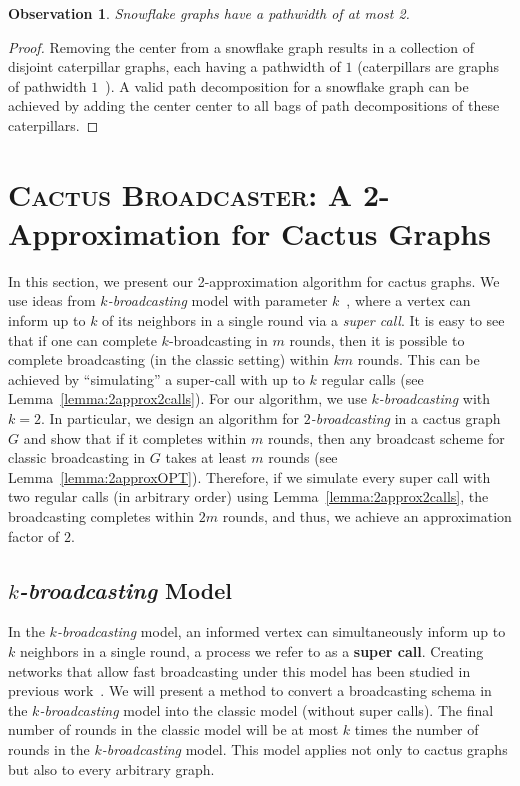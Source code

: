 \documentclass[letterpaper,11pt]{article}
\newtheorem{observation}{Observation}[section]
\newcommand{\flower}{snowflake\xspace}
\newcommand{\Flower}{Snowflake\xspace}
\newcommand{\pistil}{center\xspace}
\newcommand{\fast}{\textit{$k$-broadcasting}\xspace}
\newcommand{\Fast}{\textit{$k$-broadcasting}\xspace}
\newcommand{\twofast}{\textit{$2$-broadcasting}\xspace}
\newcommand{\ouralgo}{\textsc{Cactus Broadcaster}\xspace}
\begin{document}
\begin{observation}
\label{obs:flower-pathwidth}
    \Flower graphs have a pathwidth of at most 2. 
\end{observation}

\begin{proof}
    Removing the \pistil from a \flower graph results in a collection of disjoint caterpillar graphs, each having a pathwidth of $1$ (caterpillars are graphs of pathwidth $1$~\cite{ProskurowskiT99}). 
    A valid path decomposition for a \flower graph can be achieved by adding the \pistil center to all bags of path decompositions of these caterpillars. 
\end{proof}

 \section{\ouralgo: A 2-Approximation for Cactus Graphs}
\label{sec:2approx}

In this section, we present our 2-approximation algorithm for cactus graphs. We use ideas from \fast model with parameter $k$~\cite{grigni1991tightkbroad}, where a vertex can inform up to $k$ of its neighbors in a single round via a 
\emph{super call}. It is easy to see that if one can complete $k$-broadcasting in $m$ rounds, then it is possible to complete broadcasting (in the classic setting) within $km$ rounds. This can be achieved by ``simulating'' a super-call with up to $k$ regular calls (see  Lemma~\ref{lemma:2approx2calls}).
For our algorithm, we use \fast with $k=2$. In particular, we design an algorithm for \twofast in a cactus graph $G$ and show that if it completes within $m$ rounds, then any broadcast scheme for classic broadcasting in $G$ takes at least $m$ rounds (see Lemma~\ref{lemma:2approxOPT}). Therefore, if we simulate every super call with two regular calls (in arbitrary order) using Lemma~\ref{lemma:2approx2calls}, the broadcasting completes within $2m$ rounds, and thus, we achieve an approximation factor of $2$. 


\subsection{\Fast Model}

In the \fast model, an informed vertex can simultaneously inform up to $k$ neighbors in a single round, a process we refer to as a \textbf{super call}.  
Creating networks that allow fast broadcasting under this model has been studied in previous work~\cite{harutyunyan2001improved}. 
We will present a method to convert a broadcasting schema in the \fast model into the classic model (without super calls). The final number of rounds in the classic model will be at most $k$ times the number of rounds in the \fast model. This model applies not only to cactus graphs but also to every arbitrary graph. 
\end{document}
